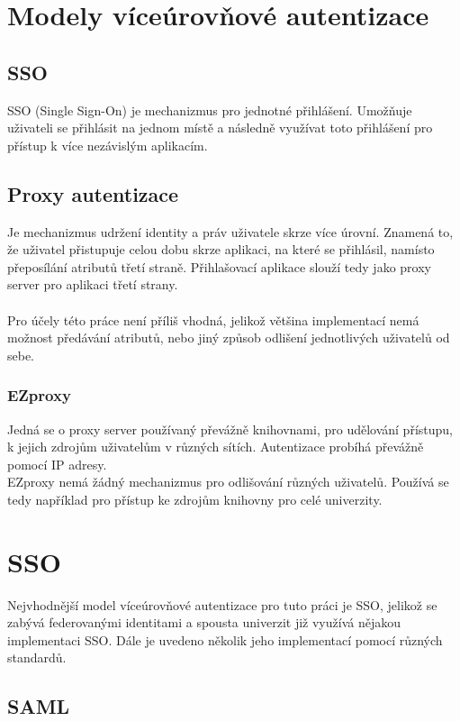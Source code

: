 \chapter{Modely víceúrovňové autentizace}
\section{SSO}
\label{sso}
SSO (Single Sign-On) je mechanizmus pro jednotné přihlášení. Umožňuje uživateli se přihlásit na jednom místě a následně využívat toto přihlášení pro přístup k více nezávislým aplikacím. \cite{SSO}

\section{Proxy autentizace}
Je mechanizmus udržení identity a práv uživatele skrze více úrovní. Znamená to, že uživatel přistupuje celou dobu skrze aplikaci, na které se přihlásil, namísto přeposílání atributů třetí straně. Přihlašovací aplikace slouží tedy jako proxy server pro aplikaci třetí strany. \cite{ProxyA} \\ \\
Pro účely této práce není příliš vhodná, jelikož většina implementací nemá možnost předávání atributů, nebo jiný způsob odlišení jednotlivých uživatelů od sebe.

\subsection{EZproxy}
Jedná se o proxy server používaný převážně knihovnami, pro udělování přístupu, k jejich zdrojům uživatelům v různých sítích. Autentizace probíhá převážně pomocí IP adresy.\\
EZproxy nemá žádný mechanizmus pro odlišování různých uživatelů. Používá se tedy například pro přístup ke zdrojům knihovny pro celé univerzity. \cite{EZproxy}\cite{wikiEZproxy}

\chapter{SSO}

Nejvhodnější model víceúrovňové autentizace pro tuto práci je SSO, jelikož se zabývá federovanými identitami a spousta univerzit již využívá nějakou implementaci SSO.
Dále je uvedeno několik jeho implementací pomocí různých standardů. 

\section{SAML}

